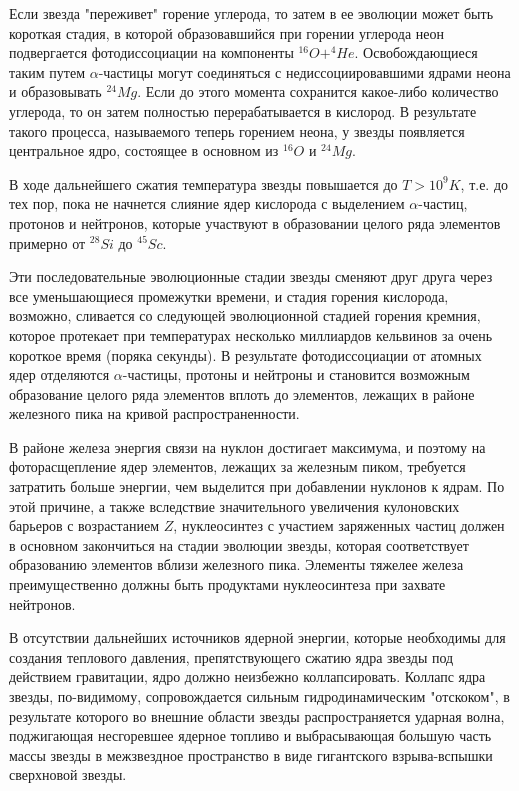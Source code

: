 Если звезда "переживет" горение углерода, то затем в ее эволюции может быть короткая стадия,
в которой образовавшийся при горении углерода неон подвергается фотодиссоциации на компоненты
$^{16} O +^4 He$. Освобождающиеся таким путем $\alpha$-частицы могут соединяться
с недиссоциировавшими ядрами неона и образовывать $^{24}Mg$.
Если до этого момента сохранится какое-либо количество углерода, то он затем полностью
перерабатывается в кислород. В результате такого процесса, называемого теперь горением
неона, у звезды появляется центральное ядро, состоящее в основном из $^{16}O$
и $^{24}Mg$.

В ходе дальнейшего сжатия температура звезды повышается до $T>10^9 K$, т.е.
до тех пор, пока не начнется слияние ядер кислорода с выделением $\alpha$-частиц,
протонов и нейтронов, которые участвуют в образовании целого ряда элементов
примерно от $^{28}Si$ до $^{45}Sc$.

Эти последовательные эволюционные стадии звезды сменяют друг друга через все
уменьшающиеся промежутки времени, и стадия горения кислорода, возможно, сливается
со следующей эволюционной стадией горения кремния, которое протекает при температурах
несколько миллиардов кельвинов за очень короткое время (поряка секунды).
В результате фотодиссоциации от атомных ядер отделяются $\alpha$-частицы,
протоны и нейтроны и становится возможным образование целого ряда элементов
вплоть до элементов, лежащих в районе железного пика на кривой распространенности.

В районе железа энергия связи на нуклон достигает максимума, и поэтому
на фоторасщепление ядер элементов, лежащих за железным пиком, требуется затратить
больше энергии, чем выделится при добавлении нуклонов к ядрам. По этой причине,
а также вследствие значительного увеличения кулоновских барьеров с возрастанием
$Z$, нуклеосинтез с участием заряженных частиц должен в основном закончиться
на стадии эволюции звезды, которая соответствует образованию элементов вблизи
железного пика. Элементы тяжелее железа преимущественно должны быть продуктами
нуклеосинтеза при захвате нейтронов.

В отсутствии дальнейших источников ядерной энергии, которые необходимы для создания
теплового давления, препятствующего сжатию ядра звезды под действием гравитации, ядро
должно неизбежно коллапсировать. Коллапс ядра звезды, по-видимому, сопровождается
сильным гидродинамическим "отскоком", в результате которого во внешние области звезды
распространяется ударная волна, поджигающая несгоревшее ядерное топливо и выбрасывающая
большую часть массы звезды в межзвездное пространство в виде гигантского взрыва-вспышки
сверхновой звезды.

